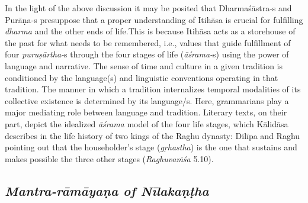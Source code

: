 In the light of the above discussion it may be posited that Dharmaśāstra-s and Purāṇa-s presuppose that a proper understanding of Itihāsa is crucial for fulfilling \textit{dharma} and the other ends of life.This is because Itihāsa acts as a storehouse of the past for what needs to be remembered, i.e., values that guide fulfillment of four \textit{puruṣārtha-}s through the four stages of life (\textit{āśrama-}s) using the power of language and narrative. The sense of time and culture in a given tradition is conditioned by the language(s) and linguistic conventions operating in that tradition. The manner in which a tradition internalizes temporal modalities of its collective existence is determined by its language/s. Here, grammarians play a major mediating role between language and tradition. Literary texts, on their part, depict the idealized \textit{āśrama} model of the four life stages, which Kālidāsa describes in the life history of two kings of the Raghu dynasty: Dilīpa and Raghu pointing out that the householder’s stage (\textit{gṛhastha}) is the one that sustains and makes possible the three other stages (\textit{Raghuvaṁśa} 5.10).

\newpage

\subsection*{\textit{Mantra-rāmāyaṇa of Nīlakaṇṭha}}

